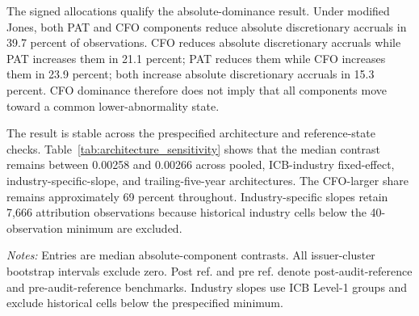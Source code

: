 The signed allocations qualify the absolute-dominance result. Under modified Jones, both PAT and CFO components reduce absolute discretionary accruals in 39.7 percent of observations. CFO reduces absolute discretionary accruals while PAT increases them in 21.1 percent; PAT reduces them while CFO increases them in 23.9 percent; both increase absolute discretionary accruals in 15.3 percent. CFO dominance therefore does not imply that all components move toward a common lower-abnormality state.

The result is stable across the prespecified architecture and reference-state checks. Table~\ref{tab:architecture_sensitivity} shows that the median contrast remains between 0.00258 and 0.00266 across pooled, ICB-industry fixed-effect, industry-specific-slope, and trailing-five-year architectures. The CFO-larger share remains approximately 69 percent throughout. Industry-specific slopes retain 7,666 attribution observations because historical industry cells below the 40-observation minimum are excluded.

\begin{table}[htbp]
\centering
\caption{RQ1 architecture and reference-state sensitivity}
\label{tab:architecture_sensitivity}
\scriptsize
{}
\begin{minipage}{0.97\textwidth}\footnotesize
\textit{Notes:} Entries are median absolute-component contrasts. All issuer-cluster bootstrap intervals exclude zero. Post ref. and pre ref. denote post-audit-reference and pre-audit-reference benchmarks. Industry slopes use ICB Level-1 groups and exclude historical cells below the prespecified minimum.
\end{minipage}
\end{table}

